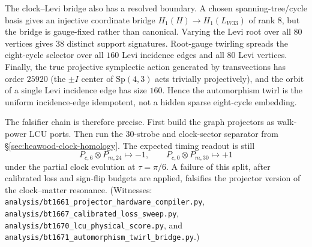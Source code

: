 The clock--Levi bridge also has a resolved boundary.  A chosen spanning-tree/cycle
basis gives an injective coordinate bridge $H_1(H)\to H_1(L_{W33})$ of rank $8$,
but the bridge is gauge-fixed rather than canonical.  Varying the Levi root over
all $80$ vertices gives $38$ distinct support signatures.  Root-gauge twirling
spreads the eight-cycle selector over all $160$ Levi incidence edges and all $80$
Levi vertices.  Finally, the true projective symplectic action generated by
transvections has order $25920$ (the $\pm I$ center of $\mathrm{Sp}(4,3)$ acts
trivially projectively), and the orbit of a single Levi incidence edge has size
$160$.  Hence the automorphism twirl is the uniform incidence-edge idempotent,
not a hidden sparse eight-cycle embedding.

The falsifier chain is therefore precise.  First build the graph projectors as
walk-power LCU ports.  Then run the $30$-strobe and clock-sector separator from
\S\ref{sec:heawood-clock-homology}.  The expected timing readout is still
\[
P_{c,6}\otimes P_{m,24}\mapsto -1,\qquad
P_{c,0}\otimes P_{m,30}\mapsto +1
\]
under the partial clock evolution at $\tau=\pi/6$.  A failure of this split,
after calibrated loss and sign-flip budgets are applied, falsifies the projector
version of the clock--matter resonance.  (Witnesses:
\texttt{analysis/bt1661\_projector\_hardware\_compiler.py},
\texttt{analysis/bt1667\_calibrated\_loss\_sweep.py},
\texttt{analysis/bt1670\_lcu\_physical\_score.py}, and
\texttt{analysis/bt1671\_automorphism\_twirl\_bridge.py}.)
